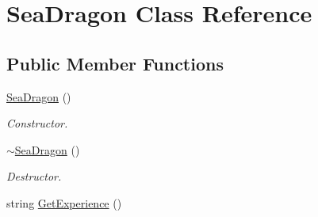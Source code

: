\hypertarget{class_sea_dragon}{}\section{Sea\+Dragon Class Reference}
\label{class_sea_dragon}
\subsection*{Public Member Functions}
\begin{DoxyCompactItemize}
\item 
\hyperlink{class_sea_dragon_a87c431ca8f3a6449abac5a55df87349b}{Sea\+Dragon} ()\hypertarget{class_sea_dragon_a87c431ca8f3a6449abac5a55df87349b}{}\label{class_sea_dragon_a87c431ca8f3a6449abac5a55df87349b}

\begin{DoxyCompactList}\small\item\em Constructor. \end{DoxyCompactList}\item 
\hyperlink{class_sea_dragon_a32875e956b9d03aff59005f90dcd7869}{$\sim$\+Sea\+Dragon} ()\hypertarget{class_sea_dragon_a32875e956b9d03aff59005f90dcd7869}{}\label{class_sea_dragon_a32875e956b9d03aff59005f90dcd7869}

\begin{DoxyCompactList}\small\item\em Destructor. \end{DoxyCompactList}\item 
string \hyperlink{class_sea_dragon_a0c65956887dc12ef009ed25821f8f4a8}{Get\+Experience} ()\hypertarget{class_sea_dragon_a0c65956887dc12ef009ed25821f8f4a8}{}\label{class_sea_dragon_a0c65956887dc12ef009ed25821f8f4a8}


\end{DoxyCompactItemize}
